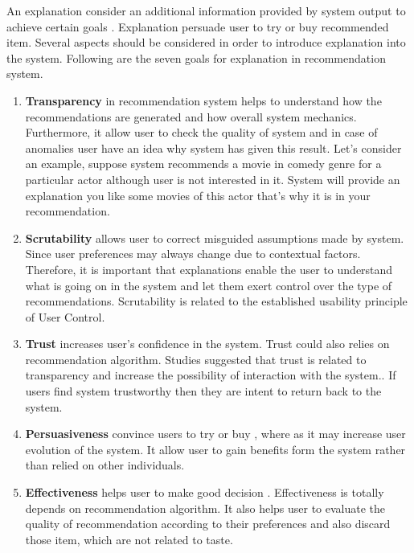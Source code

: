 An explanation consider an additional information provided by system output to achieve certain goals \cite{tintarev2011designing}. Explanation persuade user to try or buy recommended item\cite{tintarev2012evaluating}. Several aspects should be considered in order to introduce explanation into the system. Following are the seven goals for explanation in recommendation system\cite{tintarev2007survey}.

\begin{enumerate}
	\item \textbf{Transparency} in recommendation system helps to understand how the recommendations are generated and how overall system mechanics\cite{tintarev2007survey}. Furthermore, it allow user to check the quality of system and in case of anomalies user have an idea why system has given this result. Let's consider an example, suppose system recommends a movie in comedy genre for a particular actor although user is not interested in it. System will provide an explanation you like some movies of this actor that’s why it is in your recommendation.
	
	\item \textbf{Scrutability} allows user to correct misguided assumptions made by system. Since user preferences may always change due to contextual factors. Therefore, it is important that explanations enable the user to understand what is going on in the system and let them exert control over the type of recommendations. Scrutability is related to the established usability principle of User Control\cite{nielsen1990heuristic}.
	
	\item \textbf{Trust} increases user's confidence in the system\cite{tintarev2007survey}. Trust could also relies on recommendation algorithm\cite{ mcnee2003interfaces}. Studies suggested that trust is related to transparency and increase the possibility of interaction with the system.\cite{ felfernig2006empirical}. If users find system trustworthy then they are intent to return back to the system\cite{felfernig2006empirical}. 
	
	\item \textbf{Persuasiveness} convince users to try or buy \cite{tintarev2007survey}, where as it may increase user evolution of the system. It allow user to gain benefits form the system rather than relied on other individuals.

	\item \textbf{Effectiveness} helps user to make good decision \cite{tintarev2007survey}. Effectiveness is totally depends on recommendation algorithm. It also helps user to evaluate the quality of recommendation according to their preferences and also discard those item, which are not related to taste.  
	

\end{enumerate}
